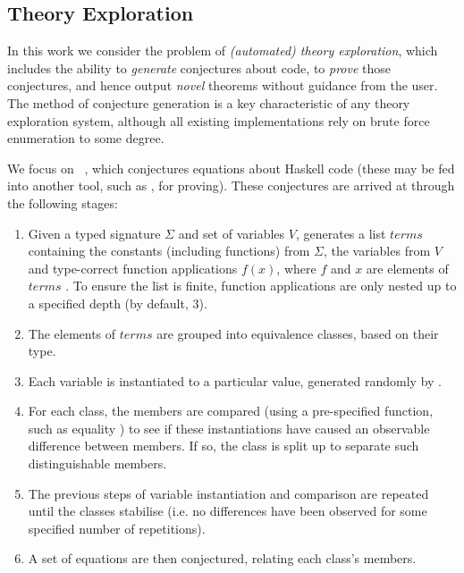 \subsection{Theory Exploration}
\label{sec:theoryexploration}

In this work we consider the problem of \emph{(automated) theory exploration},
which includes the ability to \emph{generate} conjectures about code, to
\emph{prove} those conjectures, and hence output \emph{novel} theorems without
guidance from the user. The method of conjecture generation is a key
characteristic of any theory exploration system, although all existing
implementations rely on brute force enumeration to some degree.

We focus on \qspec{}~\cite{QuickSpec}, which conjectures equations about
Haskell code (these may be fed into another tool, such as \hspec{}, for
proving). These conjectures are arrived at through the following stages:

\iffalse TODO: Make this more formal?
 V \in Var
 F \in Fun
 T \in Term
 T ::= V | F | T1 T2

 Term ::= VAR | Const | Fun (Term)
or
 Term t ::= x | f | t t'
\fi

\begin{enumerate}
\item Given a typed signature $\Sigma$ and set of variables $V$, \qspec{}
  generates a list $terms$ containing the constants (including functions) from
  $\Sigma$, the variables from $V$ and type-correct function applications
  $f(x)$, where $f$ and $x$ are elements of $terms$ \iffalse TODO: A little
  awkward; maybe use the above notation? \fi. To ensure the list is finite,
  function applications are only nested up to a specified depth (by default, 3).
\item The elements of $terms$ are grouped into equivalence classes, based on
  their type.
\item Each variable is instantiated to a particular value, generated randomly by
  \qcheck{}.
\item For each class, the members are compared (using a pre-specified function,
  such as equality \hs{==}) to see if these instantiations have caused an
  observable difference between members. If so, the class is split up to
  separate such distinguishable members.
\item The previous steps of variable instantiation and comparison are repeated
  until the classes stabilise (i.e. no differences have been observed for some
  specified number of repetitions).
\item A set of equations are then conjectured, relating each class's members.
\end{enumerate}

